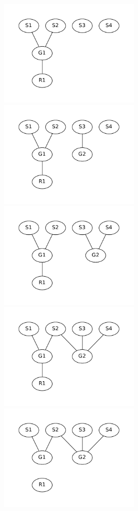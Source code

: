 \begin{figure}\label{fig:slack_series}
  \includegraphics[width=7.0cm]{fig/labgroup/slack_add_1.pdf}        
  \includegraphics[width=7.0cm]{fig/labgroup/slack_add_2.pdf}        
  \includegraphics[width=7.0cm]{fig/labgroup/slack_add_2-5.pdf}        
  \includegraphics[width=7.0cm]{fig/labgroup/slack_add_3.pdf}        
  \includegraphics[width=7.0cm]{fig/labgroup/slack_add_4.pdf}        

\end{figure}
